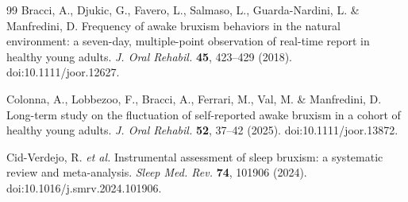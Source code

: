 \documentclass[pdflatex,sn-nature,iicol]{sn-jnl}
\begin{document}
\begin{thebibliography}{99}
Bracci, A., Djukic, G., Favero, L., Salmaso, L., Guarda-Nardini, L. \& Manfredini, D. Frequency of awake bruxism behaviors in the natural environment: a seven-day, multiple-point observation of real-time report in healthy young adults. \emph{J. Oral Rehabil.} \textbf{45}, 423--429 (2018). doi:10.1111/joor.12627.

Colonna, A., Lobbezoo, F., Bracci, A., Ferrari, M., Val, M. \& Manfredini, D. Long-term study on the fluctuation of self-reported awake bruxism in a cohort of healthy young adults. \emph{J. Oral Rehabil.} \textbf{52}, 37--42 (2025). doi:10.1111/joor.13872.

Cid-Verdejo, R. \emph{et al.} Instrumental assessment of sleep bruxism: a systematic review and meta-analysis. \emph{Sleep Med. Rev.} \textbf{74}, 101906 (2024). doi:10.1016/j.smrv.2024.101906.

\end{thebibliography}
\end{document}
